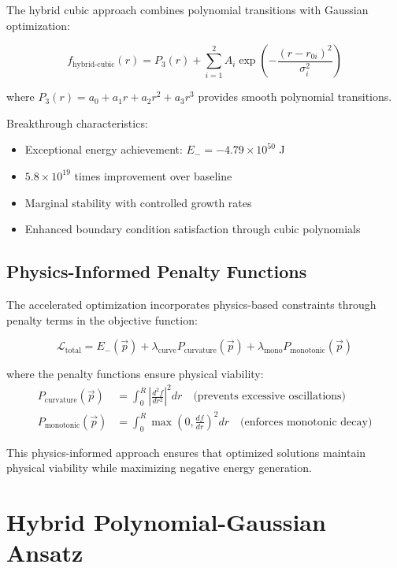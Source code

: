\documentclass[12pt,a4paper]{article}
\begin{document}
The hybrid cubic approach combines polynomial transitions with Gaussian optimization:

\begin{equation}
f_{\text{hybrid-cubic}}(r) = P_3(r) + \sum_{i=1}^{2} A_i \exp\left(-\frac{(r - r_{0i})^2}{\sigma_i^2}\right)
\end{equation}

where $P_3(r) = a_0 + a_1 r + a_2 r^2 + a_3 r^3$ provides smooth polynomial transitions.

Breakthrough characteristics:
\begin{itemize}
\item Exceptional energy achievement: $E_- = -4.79 \times 10^{50}$ J
\item $5.8 \times 10^{19}$ times improvement over baseline
\item Marginal stability with controlled growth rates
\item Enhanced boundary condition satisfaction through cubic polynomials
\end{itemize}

\subsection{Physics-Informed Penalty Functions}

The accelerated optimization incorporates physics-based constraints through penalty terms in the objective function:

\begin{equation}
\mathcal{L}_{\text{total}} = E_-(\vec{p}) + \lambda_{\text{curve}} P_{\text{curvature}}(\vec{p}) + \lambda_{\text{mono}} P_{\text{monotonic}}(\vec{p})
\end{equation}

where the penalty functions ensure physical viability:
\begin{align}
P_{\text{curvature}}(\vec{p}) &= \int_0^R \left|\frac{d^2f}{dr^2}\right|^2 dr \quad \text{(prevents excessive oscillations)} \\
P_{\text{monotonic}}(\vec{p}) &= \int_0^R \max\left(0, \frac{df}{dr}\right)^2 dr \quad \text{(enforces monotonic decay)}
\end{align}

This physics-informed approach ensures that optimized solutions maintain physical viability while maximizing negative energy generation.

\section{Hybrid Polynomial-Gaussian Ansatz}
\label{sec:hybrid_ansatz}
\end{document}
